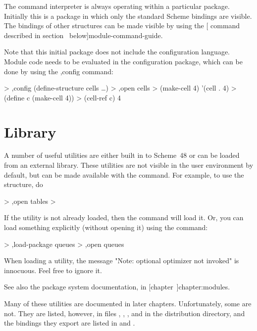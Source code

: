 The command interpreter is always operating within a particular package.
Initially this is a package in which only the standard Scheme bindings
 are visible.
The bindings of other structures can be made visible by using the 
[ command described in section~\Ref{} below]{module-command-guide}.

Note that this initial package does not include the configuration language.
Module code needs to be evaluated in the configuration package, which can
 be done by using the {\code ,config} command:
\begin{example}
> ,config (define-structure cells \ldots)
> ,open cells
> (make-cell 4)
'(cell . 4)
> (define c (make-cell 4))
> (cell-ref c)
4
\end{example}

\section{Library}

A number of useful utilities are either built in to Scheme~48 or can
be loaded from an external library.  These utilities are not visible
in the user environment by default, but can be made available with the
 command.  For example, to use the  structure, do
\begin{example}
> ,open tables
> 
\end{example}

If the utility is not already loaded, then the  command will
 load it.
Or, you can load something explicitly (without opening it) using the
 command:
\begin{example}
> ,load-package queues
> ,open queues
\end{example}

When loading a utility, the message "Note: optional optimizer not
invoked" is innocuous.  Feel free to ignore it.

See also the package system documentation, in
 [chapter~\Ref]{chapter:modules}.

Many of these utilities are documented in later chapters.
Unfortunately, some are not.  They are
listed, however, in files ,
, , and
 in the distribution directory, and the bindings they
export are listed in  and
.

